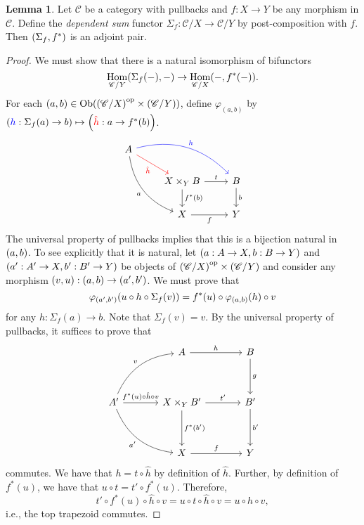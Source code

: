 \documentclass[10pt,letterpaper,cm]{nupset}
\theoremstyle{definition}
\theoremstyle{theorem}
\newtheorem{lemma}[definition]{Lemma}
\theoremstyle{remark}
\DeclareMathOperator{\ob}{Ob}
\newcommand{\0}{\mathbf{0}}
\newcommand{\1}{\mathbf{1}}
\newcommand{\2}{\mathbf{2}}
\DeclareMathOperator{\op}{op}
\renewcommand{\c}{\mathscr{C}}
\DeclareMathOperator{\Hom}{Hom}
\begin{document}
\begin{lemma}
Let $\c$ be a category with pullbacks and $f : X \to Y$ be any morphism in $\c$. Define the \textit{dependent sum} functor $\Sigma_f : \c/X \to \c/Y$ by post-composition with $f$. Then $\mleft(\Sigma_f, f^{\ast}\mright)$ is an adjoint pair.
\end{lemma}
\begin{proof}
We must show that there is a natural isomorphism of bifunctors
\[
 \Hom_{\c/Y}\mleft(\Sigma_f({-}), {-}\mright) \to \Hom_{\c/X}({-}, f^{\ast}({-}))
.\]
For each $\mleft(a, b\mright) \in \ob\mleft(\mleft(\c/X\mright)^{\op} \times \mleft(\c/Y\mright)\mright)$, define $\varphi_{(a, b)}$ by $\mleft(\mathbin{\textcolor{blue}{h}} : \Sigma_f(a) \to b\mright) \mapsto \mleft(\mathbin{\textcolor{red}{\hat{h}}} : a \to f^{\ast}(b)\mright)$.
\[
\begin{tikzcd}
A \arrow[rd, "\hat{h}"', red] \arrow[rrd, "h", bend left, blue] \arrow[rdd, "a"', bend right] &                                  &                  \\
                                                                                        & X \times_Y B \arrow[r, "t"] \arrow[d, "f^{\ast}(b)"] & B \arrow[d, "b"] \\
                                                                                        & X \arrow[r, "f"']                & Y               
\end{tikzcd}
\] The universal property of pullbacks implies that this is a bijection natural in $\mleft(a,b\mright)$. To see explicitly that it is natural, let  $\mleft(a: A \to X, b: B \to Y\mright)$ and $\mleft(a' : A' \to X, b': B' \to Y\mright)$ be objects of $\mleft(\c/X\mright)^{\op} \times \mleft(\c/Y\mright)$ and consider any morphism $\mleft(v, u\mright) : \mleft(a,b\mright) \to \mleft(a',b'\mright)$. We must prove that $$\varphi_{\mleft(a',b'\mright)}\mleft(u \circ h \circ \Sigma_f(v)\mright) = f^{\ast}(u) \circ \varphi_{(a,b)}(h) \circ v$$ for any $h : \Sigma_f(a) \to b$. Note that $\Sigma_f(v) = v$. By the universal property of pullbacks, it suffices to prove that 
\[
\begin{tikzcd}[row sep=huge, column sep=large]
                                                                                                          & A \arrow[r, "h"]                                       & B \arrow[d, "g"]   \\
A' \arrow[r, "f^{\ast}(u) \circ \hat{h}\circ v"] \arrow[ru, "v", bend left] \arrow[rd, "a'"', bend right] & X\times_Y B' \arrow[d, "f^{\ast}(b')"] \arrow[r, "t'"] & B' \arrow[d, "b'"] \\
                                                                                                          & X \arrow[r, "f"]                                       & Y                 
\end{tikzcd}
\]
commutes. We have that $ h =  t \circ \hat{h}$ by definition of $\hat{h}$. Further, by definition of $f^{\ast}(u)$, we have that $u \circ t = t' \circ f^{\ast}(u)$. Therefore, $$t' \circ f^{\ast}(u) \circ \hat{h} \circ v = u \circ t \circ \hat{h}\circ v = u\circ h \circ v,$$ i.e., the top trapezoid commutes. 


\end{proof}
\end{document}
